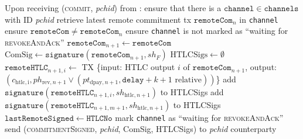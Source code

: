 \begin{algorithmic}[1]
    \State Upon receiving (\textsc{commit}, \textit{pchid}) from \environment:
    \Indent
      \State ensure that there is a $\mathtt{channel} \in \mathtt{channels}$
      with ID \textit{pchid}
      \State retrieve latest remote commitment tx $\mathtt{remoteCom}_n$ in
      \texttt{channel}
      \State ensure $\mathtt{remoteCom} \neq \mathtt{remoteCom}_n$
      \State ensure \texttt{channel} is not marked as ``waiting for
      \textsc{revokeAndAck}''
      \State $\mathtt{remoteCom}_{n+1} \gets \mathtt{remoteCom}$
      \State $\mathrm{ComSig} \gets
      \mathtt{signature}\left(\mathtt{remoteCom}_{n+1}, sh_F\right)$
      \State $\mathrm{HTLCSigs} \gets \emptyset$
        \State $\mathtt{remoteHTLC}_{n+1, i} \gets$ TX \{input: HTLC output $i$
        of $\mathtt{remoteCom}_{n+1}$, output: $\left(c_{\mathrm{htlc, i}},
        ph_{\mathrm{rev}, n+1} \vee \left(pt_{\mathrm{dpay}, n+1},
        \mathtt{delay} + k + 1 \text{ relative}\right)\right)$\}
        \State add $\mathtt{signature}\left(\mathtt{remoteHTLC}_{n+1, i},
        sh_{\mathrm{htlc}, n+1}\right)$ to HTLCSigs
      \EndFor
      \State add $\mathtt{signature}\left(\mathtt{remoteHTLC}_{n+1, m+1},
      sh_{\mathrm{htlc}, n+1}\right)$ to HTLCSigs
      \State $\mathtt{lastRemoteSigned} \gets \mathtt{HTLCNo}$
      \State mark \texttt{channel} as ``waiting for \textsc{revokeAndAck}''
      \State send (\textsc{commitmentSigned}, \textit{pchid}, ComSig, HTLCSigs)
      to \textit{pchid} counterparty
    \EndIndent
    \State


\end{algorithmic}
